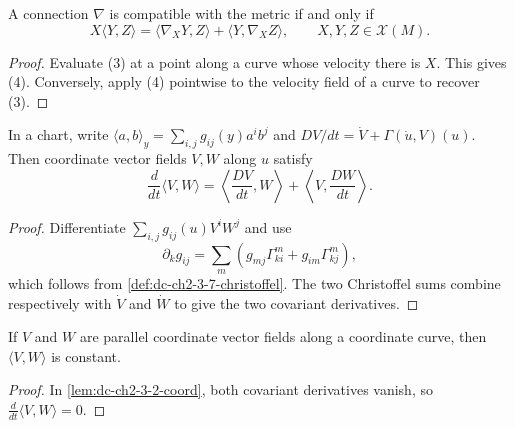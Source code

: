 \begin{corollary}
  \label{cor:dc-ch2-3-3}
  \leanok
  A connection $\nabla$ is compatible with the metric if and only if
  \[
    X\langle Y,Z\rangle
      =\langle\nabla_XY,Z\rangle+\langle Y,\nabla_XZ\rangle,
    \qquad X,Y,Z\in\mathcal{X}(M).\tag{4}
  \]
\end{corollary}
\begin{proof}
  \sketch
  Evaluate (3) at a point along a curve whose velocity there is $X$. This gives
  (4). Conversely, apply (4) pointwise to the velocity field of a curve to
  recover (3).
\end{proof}

\begin{lemma}
  \label{lem:dc-ch2-3-2-coord}
  \leanok
  In a chart, write
  $\langle a,b\rangle_y=\sum_{i,j}g_{ij}(y)a^ib^j$ and
  $DV/dt=\dot V+\Gamma(\dot u,V)(u)$. Then coordinate vector fields $V,W$
  along $u$ satisfy
  \[
    \frac{d}{dt}\langle V,W\rangle
      =\left\langle\frac{DV}{dt},W\right\rangle
       +\left\langle V,\frac{DW}{dt}\right\rangle.
  \]
\end{lemma}
\begin{proof}
  \leanok
  \sketch
  Differentiate $\sum_{i,j}g_{ij}(u)V^iW^j$ and use
  \[
    \partial_kg_{ij}
      =\sum_m\left(g_{mj}\Gamma^m_{ki}+g_{im}\Gamma^m_{kj}\right),
  \]
  which follows from \cref{def:dc-ch2-3-7-christoffel}. The two Christoffel
  sums combine respectively with $\dot V$ and $\dot W$ to give the two
  covariant derivatives.
\end{proof}

\begin{lemma}
  \label{lem:dc-ch2-3-1-coord}
  \leanok
  If $V$ and $W$ are parallel coordinate vector fields along a coordinate
  curve, then $\langle V,W\rangle$ is constant.
\end{lemma}
\begin{proof}
  \leanok
  \sketch
  In \cref{lem:dc-ch2-3-2-coord}, both covariant derivatives vanish, so
  $\frac{d}{dt}\langle V,W\rangle=0$.
\end{proof}

